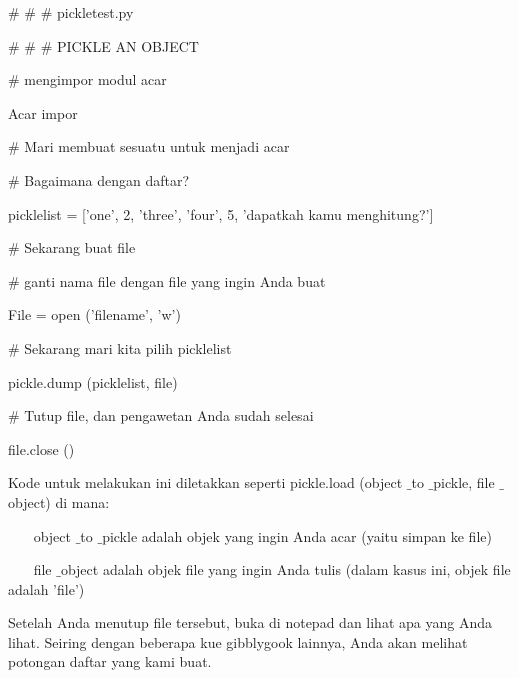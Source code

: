 \vspace{12pt}
\noindent 
 $  \#  $ $  \#  $ $  \#  $ pickletest.py \par
\noindent 
 $  \#  $ $  \#  $ $  \#  $ PICKLE AN OBJECT \par
\vspace{12pt}
\noindent 
 $  \#  $ mengimpor modul acar \par
\noindent 
Acar impor \par
\vspace{12pt}
\noindent 
 $  \#  $ Mari membuat sesuatu untuk menjadi acar \par
\noindent 
 $  \#  $ Bagaimana dengan daftar? \par
\noindent 
picklelist = ['one', 2, 'three', 'four', 5, 'dapatkah kamu menghitung?'] \par
\vspace{12pt}
\noindent 
 $  \#  $ Sekarang buat file \par
\noindent 
 $  \#  $ ganti nama file dengan file yang ingin Anda buat \par
\noindent 
File = open ('filename', 'w') \par
\vspace{12pt}
\noindent 
 $  \#  $ Sekarang mari kita pilih picklelist \par
\noindent 
pickle.dump (picklelist, file) \par
\vspace{12pt}
\noindent 
 $  \#  $ Tutup file, dan pengawetan Anda sudah selesai \par
\noindent 
file.close () \par
\vspace{12pt}
\noindent 
Kode untuk melakukan ini diletakkan seperti pickle.load (object $  \_  $to $  \_  $pickle, file $  \_  $object) di mana: \par
\vspace{12pt}
\noindent 
~~~ object $  \_  $to $  \_  $pickle adalah objek yang ingin Anda acar (yaitu simpan ke file) \par
\noindent 
~~~ file $  \_  $object adalah objek file yang ingin Anda tulis (dalam kasus ini, objek file adalah 'file') \par
\vspace{12pt}
\noindent 
Setelah Anda menutup file tersebut, buka di notepad dan lihat apa yang Anda lihat. Seiring dengan beberapa kue gibblygook lainnya, Anda akan melihat potongan daftar yang kami buat. \par
\vspace{12pt}
